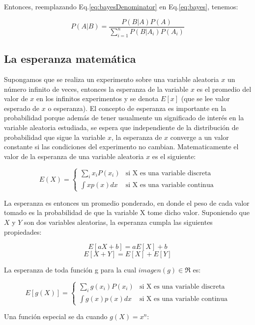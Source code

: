 \documentclass[a4paper, 11pt, oneside]{report}
\begin{document}
Entonces, reemplazando Eq.\ref{eq:bayesDenominator} en Eq.\ref{eq:bayes}, tenemos:
	
	\begin{equation}\label{eq:bayes2}
		P(A|B) = \frac{P(B|A)P(A)}{\sum_{i=1}^{n}{P(B|A_i)P(A_i)}}
	\end{equation}
	
\subsection{La esperanza matemática}

Supongamos que se realiza un experimento sobre una variable aleatoria $x$ un número infinito de veces, entonces la esperanza de la variable $x$ es el promedio del valor de $x$ en los infinitos experimentos y se denota $E[x]$ (que se lee valor esperado de $x$ o esperanza). El concepto de esperanza es importante en la probabilidad porque además de tener usualmente un significado de interés en la variable aleatoria estudiada, se espera que independiente de la distribución de probabilidad que sigue la variable $x$, la esperanza de $x$ converge a un valor constante si las condiciones del experimento no cambian. Matematicamente el valor de la esperanza de una variable aleatoria $x$ es el siguiente:

	\[ E(X) = \left\{ \begin{array}{ll}
		\sum_{i}{x_iP(x_i)}   & \mbox{si X es una variable discreta} \\
		\int {xp(x)dx} & \mbox{si X es una variable continua}
	\end{array} \right. \]

La esperanza es entonces un promedio ponderado, en donde el peso de cada valor tomado es la probabilidad de que la variable X tome dicho valor. Suponiendo que $X$ y $Y$ son dos variables aleatorias, la esperanza cumpla las siguientes propiedades:

	\[E[aX + b] = aE[X] + b\]
	\[E[X + Y] = E[X] + E[Y]\]

La esperanza de toda función g para la cual $imagen(g) \in \Re$ es:

	\[ E[g(X)] = \left\{ \begin{array}{ll}
		\sum_{i}{g(x_i)P(x_i)}   & \mbox{si X es una variable discreta} \\
		\int {g(x)p(x)dx} & \mbox{si X es una variable continua}
	\end{array} \right. \]

Una función especial se da cuando $g(X) = x^n$:
\end{document}
